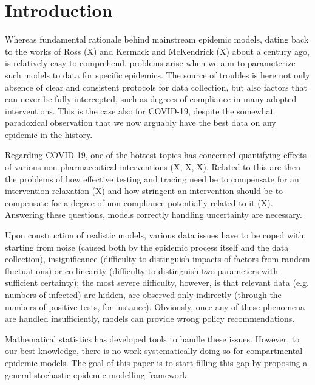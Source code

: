\documentclass[english]{elsarticle}
\theoremstyle{plain}
\theoremstyle{remark}
\theoremstyle{plain}
\theoremstyle{definition}
\begin{document}
\section{Introduction}

Whereas fundamental rationale behind mainstream epidemic models, dating back to the works of Ross (X) and Kermack and McKendrick (X) about a century ago, is relatively easy to comprehend, problems arise when we aim to parameterize such models to data for specific epidemics. The source of troubles is here not only absence of clear and consistent protocols for data collection, but also factors that can never be fully intercepted, such as degrees of compliance in many adopted interventions. This is the case also for COVID-19, despite the somewhat paradoxical observation that we now arguably have the best data on any epidemic in the history. 

Regarding COVID-19, one of the hottest topics has concerned quantifying effects of various non-pharmaceutical interventions (X, X, X). Related to this are then the problems of how effective testing and tracing need be to compensate for an intervention relaxation (X) and how stringent an intervention should be to compensate for a degree of non-compliance potentially related to it (X). Answering these questions, models correctly handling uncertainty are necessary.

Upon construction of realistic models, various data issues have to be coped with, starting from noise (caused both by the epidemic process itself and the data collection), insignificance (difficulty to distinguish impacts of factors from random fluctuations) or co-linearity (difficulty to distinguish two parameters with sufficient certainty); the most severe difficulty, however, is that relevant data (e.g. numbers of infected) are hidden, are observed only indirectly (through the numbers of positive tests, for instance).  Obviously, once any of these phenomena are handled insufficiently, models can provide wrong policy recommendations. 

Mathematical statistics has developed tools to handle these issues. However, to our best knowledge, there is no work systematically doing so for compartmental epidemic models. The goal of this paper is to start filling this gap by proposing a general stochastic epidemic modelling framework. 
\end{document}
